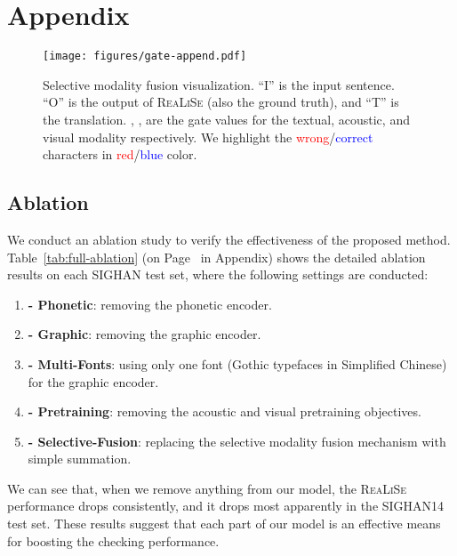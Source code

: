 \documentclass[11pt,a4paper]{article}
\newcommand\model{\textsc{ReaLiSe}}
\begin{document}



\clearpage

\appendix
\section{Appendix}

\begin{figure}[t]
    \centering
    \texttt{[image: figures/gate-append.pdf]}
    \caption{Selective modality fusion visualization. ``I'' is the input sentence. ``O'' is the output of \model{} (also the ground truth), and ``T'' is the translation. , ,  are the gate values for the textual, acoustic, and visual modality respectively. We highlight the \textcolor{red}{wrong}/\textcolor{blue}{correct} characters in \textcolor{red}{red}/\textcolor{blue}{blue} color.}
    \label{fig:gate-apd}
\end{figure}


\subsection{Ablation}
\label{apd:ablation}
We conduct an ablation study to verify the effectiveness of the proposed method.
Table~\ref{tab:full-ablation} (on Page~\pageref{tab:full-ablation} in Appendix) shows the detailed ablation results on each SIGHAN test set, where the following settings are conducted:
\begin{enumerate}
    \item \textbf{- Phonetic}: removing the phonetic encoder.
    \item \textbf{- Graphic}: removing the graphic encoder.
    \item \textbf{- Multi-Fonts}: using only one font (Gothic typefaces in Simplified Chinese) for the graphic encoder.
    \item \textbf{- Pretraining}: removing the acoustic and visual pretraining objectives.
    \item \textbf{- Selective-Fusion}: replacing the selective modality fusion mechanism with simple summation.
\end{enumerate}

We can see that, when we remove anything from our model, the \model{} performance drops consistently, and it drops most apparently in the SIGHAN14 test set.
These results suggest that each part of our model is an effective means for boosting the checking performance.
\end{document}

